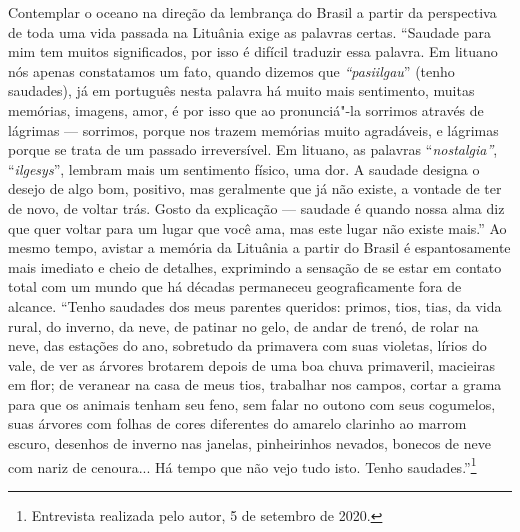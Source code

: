 {Contemplar o oceano na direção da lembrança do Brasil a partir da
perspectiva de toda uma vida passada na Lituânia exige as palavras
certas. ``Saudade para mim tem muitos significados, por isso é difícil
traduzir essa palavra. Em lituano nós apenas constatamos um fato, quando
dizemos que \textit{``pasiilgau}'' (tenho saudades), já em português nesta
palavra há muito mais sentimento, muitas memórias, imagens, amor, é por
isso que ao pronunciá"-la sorrimos através de lágrimas --- sorrimos,
porque nos trazem memórias muito agradáveis, e lágrimas porque se trata
de um passado irreversível. Em lituano, as palavras
``\textit{nostalgia''}, ``\textit{ilgesys}'', lembram mais um sentimento
físico, uma dor. A saudade designa o desejo de algo bom, positivo, mas
geralmente que já não existe, a vontade de ter de novo, de voltar trás.
Gosto da explicação --- saudade é quando nossa alma diz que quer voltar
para um lugar que você ama, mas este lugar não existe mais.'' Ao mesmo
tempo, avistar a memória da Lituânia a partir do Brasil é espantosamente
mais imediato e cheio de detalhes, exprimindo a sensação de se estar em
contato total com um mundo que há décadas permaneceu geograficamente
fora de alcance. ``Tenho saudades dos meus parentes queridos: primos,
tios, tias, da vida rural, do inverno, da neve, de patinar no gelo, de
andar de trenó, de rolar na neve, das estações do ano, sobretudo da
primavera com suas violetas, lírios do vale, de ver as árvores brotarem
depois de uma boa chuva primaveril, macieiras em flor; de veranear na
casa de meus tios, trabalhar nos campos, cortar a grama para que os
animais tenham seu feno, sem falar no outono com seus cogumelos, suas
árvores com folhas de cores diferentes do amarelo clarinho ao marrom
escuro, desenhos de inverno nas janelas, pinheirinhos nevados, bonecos
de neve com nariz de cenoura... Há tempo que não vejo tudo isto. Tenho
saudades.''\footnote{Entrevista realizada pelo autor, 5 de setembro de
  2020.}

}
